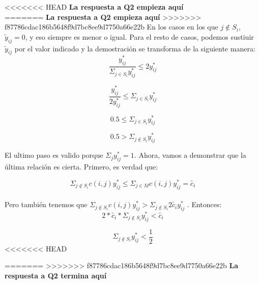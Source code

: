 <<<<<<< HEAD
\textbf{La respuesta a Q2 empieza aquí} 
\\
=======
\textbf{La respuesta a Q2 empieza aquí}
>>>>>>> f87786cdac186b5648f9d7bc8ee9d7750a66e22b
En los casos en los que $j \notin S_i$, $\tilde{y}_{ij} = 0$, y eso siempre es menor o igual.
Para el resto de casos, podemos sustiuir $\tilde{y}_{ij}$ por el valor indicado y la demostración se transforma de la siguiente manera:
\begin{equation}
 \frac{y^*_{ij}}{\Sigma_{j \in S_i} y^*_{ij}} \leq 2y^*_{ij}
\end{equation}

\begin{equation}
 \frac{y^*_{ij}}{2y^*_{ij}} \leq \Sigma_{j \in S_i} y^*_{ij}
\end{equation}

\begin{equation}
 0.5 \leq \Sigma_{j \in S_i} y^*_{ij}
\end{equation}

\begin{equation}
 0.5 > \Sigma_{j \notin S_i} y^*_{ij}
\end{equation}

El ultimo paso es valido porque $\Sigma_{j} y^*_{ij} = 1$. Ahora, vamos a demonstrar que la última relación es cierta. Primero, es verdad que:

\begin{equation}
 \Sigma_{j \notin S_i} c(i,j) y^*_{ij} \leq \Sigma_{j \in M} c(i,j) y^*_{ij} = \tilde{c_i}
\end{equation}
\\
Pero también tenemos que $\Sigma_{j \notin S_i} c(i,j) y^*_{ij} > \Sigma_{j \notin S_i} 2 \tilde{c_i} y^*_{ij}$ . Entonces:
\\
\begin{equation}
 2* \tilde{c_i} * \Sigma_{j \notin S_i} y^*_{ij}  < \tilde{c_i}
\end{equation}

\begin{equation}
 \Sigma_{j \notin S_i} y^*_{ij} < \frac{1}{2}
\end{equation}
<<<<<<< HEAD


=======
>>>>>>> f87786cdac186b5648f9d7bc8ee9d7750a66e22b
\textbf{La respuesta a Q2 termina aquí}
